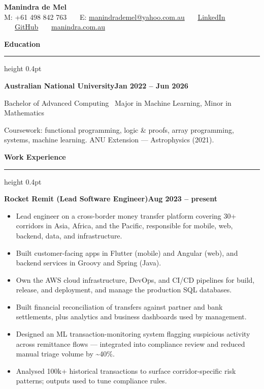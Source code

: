 \documentclass[11pt,a4paper]{article}
\newcommand{\edsection}[1]{%
  \par\vspace{6pt}%
  \textbf{#1}\par
  \vspace{0pt}\hrule height 0.4pt\vspace{2pt}%
}
\newcommand{\entry}[2]{\textbf{#1}\hfill\textbf{#2}\par}
\begin{document}
\begin{center}
{\LARGE\bfseries Manindra de Mel}\\[3pt]
{\small M: +61 498 842 763 \ \textbar\ \ E: \href{mailto:manindrademel@yahoo.com.au}{manindrademel@yahoo.com.au} \ \textbar\ \ \href{https://www.linkedin.com/in/manindra-de-mel/}{LinkedIn} \ \textbar\ \ \href{https://github.com/ManindraDeMel}{GitHub} \ \textbar\ \ \href{https://manindra.com.au}{manindra.com.au}}
\end{center}

\edsection{Education}

\entry{Australian National University}{Jan 2022 -- Jun 2026}
Bachelor of Advanced Computing \textbar\ Major in Machine Learning, Minor in Mathematics

Coursework: functional programming, logic \& proofs, array programming, systems, machine learning. ANU Extension --- Astrophysics (2021).

\edsection{Work Experience}

\entry{Rocket Remit (Lead Software Engineer)}{Aug 2023 -- present}
\begin{itemize}
\item Lead engineer on a cross-border money transfer platform covering 30+ corridors in Asia, Africa, and the Pacific, responsible for mobile, web, backend, data, and infrastructure.
\item Built customer-facing apps in Flutter (mobile) and Angular (web), and backend services in Groovy and Spring (Java).
\item Own the AWS cloud infrastructure, DevOps, and CI/CD pipelines for build, release, and deployment, and manage the production SQL databases.
\item Built financial reconciliation of transfers against partner and bank settlements, plus analytics and business dashboards used by management.
\item Designed an ML transaction-monitoring system flagging suspicious activity across remittance flows --- integrated into compliance review and reduced manual triage volume by \textasciitilde40\%.
\item Analysed 100k+ historical transactions to surface corridor-specific risk patterns; outputs used to tune compliance rules.
\end{itemize}
\end{document}
